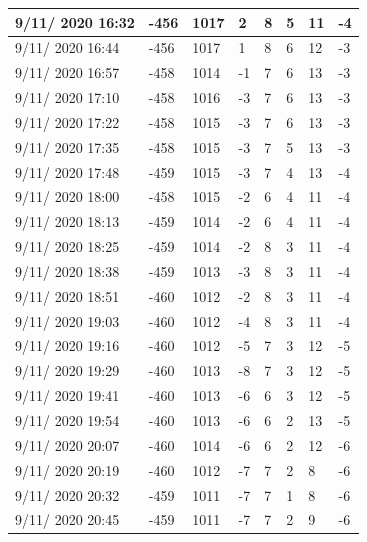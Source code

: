 \begin{table}[h]
\begin{tabular}{|p{3cm}|p{1cm}|p{1cm}|p{1cm}|p{1cm}|p{1cm}|p{1cm}|p{1cm}|}
9/11/ 2020 16:32&	-456&	1017&	2&	8&	5&	11&	-4 \\ \hline
9/11/ 2020 16:44&	-456&	1017&	1&	8&	6&	12&	-3 \\ \hline
9/11/ 2020 16:57&	-458&	1014&	-1&	7&	6&	13&	-3 \\ \hline
9/11/ 2020 17:10&	-458&	1016&	-3&	7&	6&	13&	-3 \\ \hline
9/11/ 2020 17:22&	-458&	1015&	-3&	7&	6&	13&	-3 \\ \hline
9/11/ 2020 17:35&	-458&	1015&	-3&	7&	5&	13&	-3 \\ \hline
9/11/ 2020 17:48&	-459&	1015&	-3&	7&	4&	13&	-4 \\ \hline
9/11/ 2020 18:00&	-458&	1015&	-2&	6&	4&	11&	-4 \\ \hline
9/11/ 2020 18:13&	-459&	1014&	-2&	6&	4&	11&	-4 \\ \hline
9/11/ 2020 18:25&	-459&	1014&	-2&	8&	3&	11&	-4 \\ \hline
9/11/ 2020 18:38&	-459&	1013&	-3&	8&	3&	11&	-4 \\ \hline
9/11/ 2020 18:51&	-460&	1012&	-2&	8&	3&	11&	-4 \\ \hline
9/11/ 2020 19:03&	-460&	1012&	-4&	8&	3&	11&	-4 \\ \hline
9/11/ 2020 19:16&	-460&	1012&	-5&	7&	3&	12&	-5 \\ \hline
9/11/ 2020 19:29&	-460&	1013&	-8&	7&	3&	12&	-5 \\ \hline
9/11/ 2020 19:41&	-460&	1013&	-6&	6&	3&	12&	-5 \\ \hline
9/11/ 2020 19:54&	-460&	1013&	-6&	6&	2&	13&	-5 \\ \hline
9/11/ 2020 20:07&	-460&	1014&	-6&	6&	2&	12&	-6 \\ \hline
9/11/ 2020 20:19&	-460&	1012&	-7&	7&	2&	8&	-6 \\ \hline
9/11/ 2020 20:32&	-459&	1011&	-7&	7&	1&	8&	-6 \\ \hline
9/11/ 2020 20:45&	-459&	1011&	-7&	7&	2&	9&	-6 \\ \hline
    \end{tabular}
\end{table}
